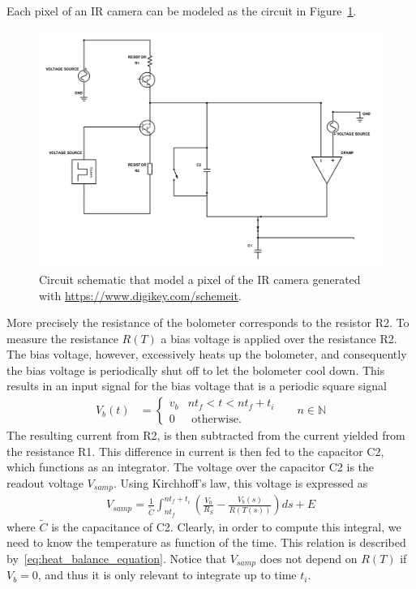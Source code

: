 Each pixel of an IR camera can be modeled as the circuit in Figure~\ref{fig:circuit}.
\begin{figure}[ht]
 \includegraphics[scale=0.31]{gfx/circuit.png}
\caption{Circuit schematic that model a pixel of the IR camera generated with \url{https://www.digikey.com/schemeit}.}
\label{fig:circuit}
\end{figure}
More precisely the resistance of the bolometer corresponds to the resistor
R2. To measure the resistance $R(T)$ a bias voltage is applied over the resistance R2. The bias voltage, however, excessively heats up the
bolometer, and consequently the bias voltage is periodically shut off
to let the bolometer cool down. This results in an input signal for the bias
voltage that is a periodic square signal
\begin{align} \label{eq:Vb}
 V_b(t)&=\begin{cases} v_b & n t_f < t < n t_f + t_i \\
 0 &\mbox{ otherwise.}
 \end{cases} && n \in {\mathbb N}
\end{align}
The resulting current from R2, is then subtracted from the current
yielded from the resistance R1. This difference in current is then
fed to the capacitor C2, which functions as an integrator. The voltage
over the capacitor C2 is the readout voltage
$V_{samp}$. Using Kirchhoff's law, this voltage is expressed as
\begin{align} \label{eq:Vsamp_def}
 V_{samp} =
 \frac{1}{\tilde C} \int_{n t_f}^{n t_f + t_i} \left( \frac{V_0}{R_S} - \frac{V_b(s)}{R(T(s))} \right) ds + E
\end{align}
where $\tilde C$ is
the capacitance of C2. Clearly, in order to compute this integral, we
need to know the temperature as function of the time. This relation is
described by~\eqref{eq:heat_balance_equation}. Notice that $V_{samp}$
does not depend on $R(T)$ if $V_b = 0$, and thus it is only relevant to
integrate up to time $t_i$.

